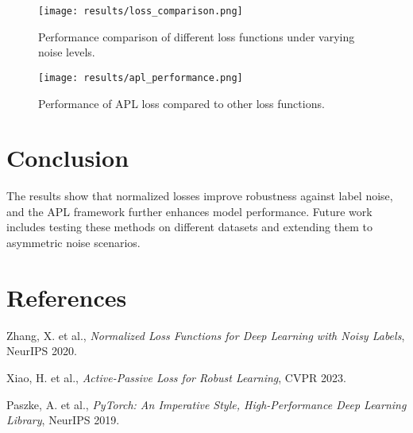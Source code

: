 \documentclass{article}
\begin{document}
\begin{figure}[h]
    \centering
    \texttt{[image: results/loss\_comparison.png]}
    \caption{Performance comparison of different loss functions under varying noise levels.}
    \label{fig:ce_vs_nce}
\end{figure}

\begin{figure}[h]
    \centering
    \texttt{[image: results/apl\_performance.png]}
    \caption{Performance of APL loss compared to other loss functions.}
    \label{fig:apl_performance}
\end{figure}

\section{Conclusion}
The results show that normalized losses improve robustness against label noise, and the APL framework further enhances model performance. Future work includes testing these methods on different datasets and extending them to asymmetric noise scenarios.

\section{References}
\begin{thebibliography}{9}
Zhang, X. et al., \textit{Normalized Loss Functions for Deep Learning with Noisy Labels}, NeurIPS 2020.

Xiao, H. et al., \textit{Active-Passive Loss for Robust Learning}, CVPR 2023.

Paszke, A. et al., \textit{PyTorch: An Imperative Style, High-Performance Deep Learning Library}, NeurIPS 2019.

\end{thebibliography}
\end{document}
